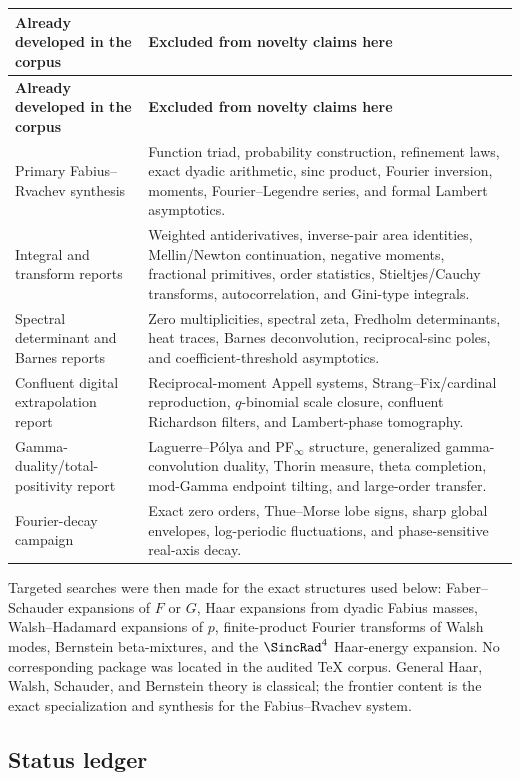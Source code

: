 \documentclass[11pt]{article}
\theoremstyle{definition}
\theoremstyle{remark}
\begin{document}
\begin{longtable}{@{}p{}p{}@{}}
\toprule
\textbf{Already developed in the corpus} & \textbf{Excluded from novelty claims here}\\
\midrule
\endfirsthead
\toprule
\textbf{Already developed in the corpus} & \textbf{Excluded from novelty claims here}\\
\midrule
\endhead
Primary Fabius--Rvachev synthesis & Function triad, probability construction,
refinement laws, exact dyadic arithmetic, sinc product, Fourier inversion,
moments, Fourier--Legendre series, and formal Lambert asymptotics.\\
Integral and transform reports & Weighted antiderivatives, inverse-pair area
identities, Mellin/Newton continuation, negative moments, fractional primitives,
order statistics, Stieltjes/Cauchy transforms, autocorrelation, and Gini-type
integrals.\\
Spectral determinant and Barnes reports & Zero multiplicities, spectral zeta,
Fredholm determinants, heat traces, Barnes deconvolution, reciprocal-sinc poles,
and coefficient-threshold asymptotics.\\
Confluent digital extrapolation report & Reciprocal-moment Appell systems,
Strang--Fix/cardinal reproduction, $q$-binomial scale closure, confluent
Richardson filters, and Lambert-phase tomography.\\
Gamma-duality/total-positivity report & Laguerre--P\'olya and PF$_\infty$
structure, generalized gamma-convolution duality, Thorin measure, theta
completion, mod-Gamma endpoint tilting, and large-order transfer.\\
Fourier-decay campaign & Exact zero orders, Thue--Morse lobe signs, sharp global
envelopes, log-periodic fluctuations, and phase-sensitive real-axis decay.\\
\bottomrule
\end{longtable}

Targeted searches were then made for the exact structures used below:
Faber--Schauder expansions of $F$ or $G$, Haar expansions from dyadic Fabius
masses, Walsh--Hadamard expansions of $p$, finite-product Fourier transforms of
Walsh modes, Bernstein beta-mixtures, and the $\SincRad^4$ Haar-energy expansion.
No corresponding package was located in the audited TeX corpus.  General Haar,
Walsh, Schauder, and Bernstein theory is classical; the frontier content is the
exact specialization and synthesis for the Fabius--Rvachev system.

\subsection{Status ledger}
\end{document}
